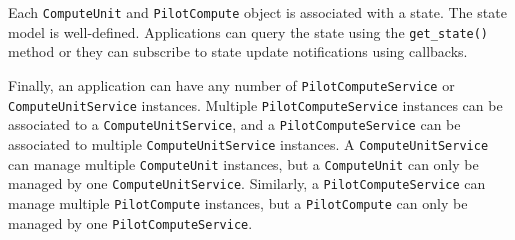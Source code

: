 \documentclass[conference]{IEEEtran}
\begin{document}


Each \texttt{Compute\-Unit} and \texttt{Pilot\-Compute} object is associated
with a state.
The state model is well-defined.
Applications can query the state using the \texttt{get\_state()} method or 
they can subscribe to state update notifications using callbacks.

Finally, an application can have any number of \texttt{Pilot\-Compute\-Service} or
\texttt{Compute\-Unit\-Service} instances.
Multiple \texttt{Pilot\-Compute\-Service} instances can be associated to a
\texttt{Compute\-Unit\-Service}, and a \texttt{Pilot\-Compute\-Service} can be associated to
multiple \texttt{Compute\-Unit\-Service} instances.
A \texttt{Compute\-Unit\-Service} can manage multiple \texttt{Compute\-Unit}
instances, but a \texttt{Compute\-Unit} can only be managed by one
\texttt{Compute\-Unit\-Service}.
Similarly, a \texttt{Pilot\-Compute\-Service} can manage multiple
\texttt{Pilot\-Compute} instances, but a \texttt{Pilot\-Compute} can only be
managed by one \texttt{Pilot\-Compute\-Service}.
\end{document}
